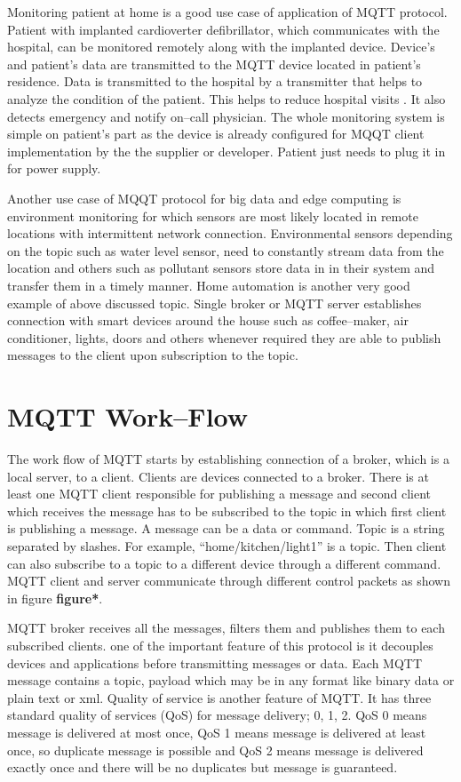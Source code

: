 \documentclass[sigconf]{acmart}
\begin{document}
Monitoring patient at home is a good use case of application of MQTT protocol. Patient with implanted cardioverter defibrillator, which communicates with the hospital, can be monitored remotely along with the implanted device. Device's and patient's data are transmitted to the MQTT device located in patient's residence. Data is transmitted to the hospital by a transmitter that helps to analyze the condition of the patient. This helps to reduce hospital visits \cite{www-ibm-com/support}. It also detects emergency and notify on--call physician. The whole monitoring system is simple on patient's part as the device is already configured for MQQT client implementation by the the supplier or developer. Patient just needs to plug it in for power supply.

Another use case of MQQT protocol for big data and edge computing is environment monitoring for which sensors are most likely located in remote locations with intermittent network  connection. Environmental sensors depending on the topic such as water level sensor, need to constantly stream data from the location and others such as pollutant sensors store data in in their system and transfer them in a timely manner. Home automation is another  very good example of above discussed topic. Single broker or MQTT server establishes connection with smart devices around the house such as coffee--maker, air conditioner, lights, doors and others whenever required they are able to publish messages to the client upon subscription to the topic.

\section{MQTT Work--Flow}
The work flow of MQTT starts by establishing connection of a broker, which is a local server, to a client. Clients are devices connected to a broker. There is at least one MQTT client responsible for publishing a message and second client which receives the message has to be subscribed to the topic in which first client is publishing a message. A message can be a data or command. Topic is a string separated by slashes. For example, ``home/kitchen/light1'' is a topic. Then client can also subscribe to a topic to a different device through a different command. MQTT client and server communicate through different control packets as shown in figure \textbf{figure*}.

MQTT broker receives all the messages, filters them and publishes them to each subscribed clients. one of the important feature of this protocol is it decouples devices and applications before transmitting messages or data. Each MQTT message contains a topic, payload which may be in any format like binary data or plain text or xml. Quality of service is another feature of MQTT. It has three standard quality of services (QoS) for message delivery; 0, 1, 2. QoS 0 means message is delivered at most once, QoS 1 means message is delivered at least once, so duplicate message is possible and QoS 2 means message is delivered exactly once and there will be no duplicates but message is guaranteed.
\end{document}
